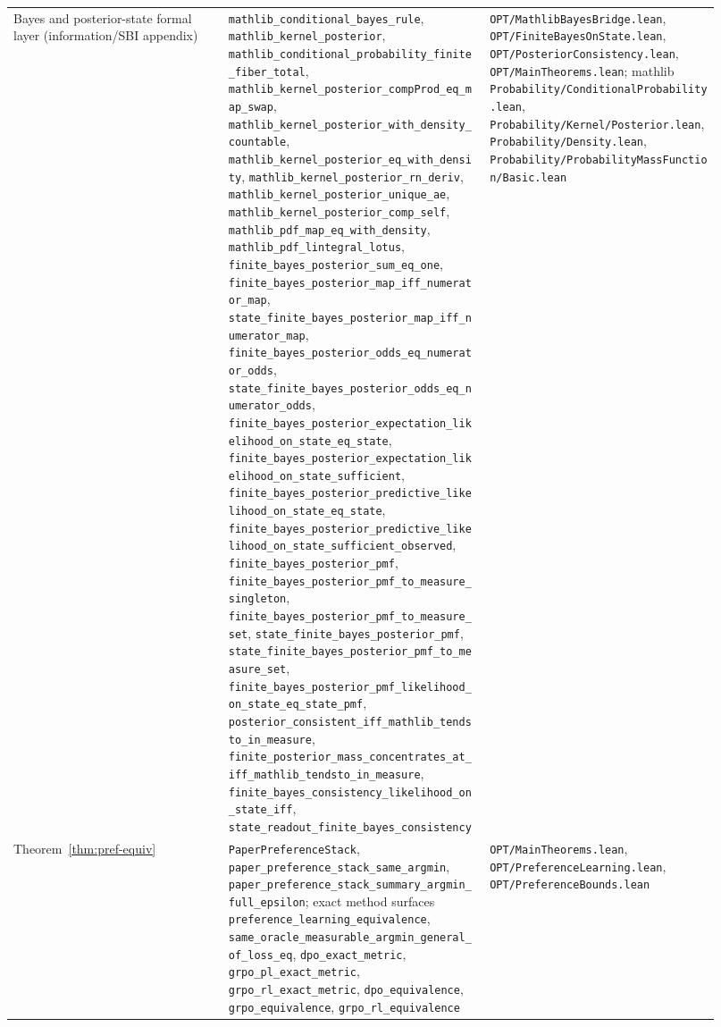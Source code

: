 \begin{table}[h]
\begin{tabular}{p{0.28\linewidth}p{0.34\linewidth}p{0.30\linewidth}}
Bayes and posterior-state formal layer (information/SBI appendix) &
\texttt{mathlib\_conditional\_bayes\_rule}, \texttt{mathlib\_kernel\_posterior},
\nolinkurl{mathlib_conditional_probability_finite_fiber_total},
\nolinkurl{mathlib_kernel_posterior_compProd_eq_map_swap},
\nolinkurl{mathlib_kernel_posterior_with_density_countable},
\nolinkurl{mathlib_kernel_posterior_eq_with_density},
\nolinkurl{mathlib_kernel_posterior_rn_deriv},
\nolinkurl{mathlib_kernel_posterior_unique_ae},
\nolinkurl{mathlib_kernel_posterior_comp_self},
\texttt{mathlib\_pdf\_map\_eq\_with\_density},
\texttt{mathlib\_pdf\_lintegral\_lotus},
\texttt{finite\_bayes\_posterior\_sum\_eq\_one},
\nolinkurl{finite_bayes_posterior_map_iff_numerator_map},
\nolinkurl{state_finite_bayes_posterior_map_iff_numerator_map},
\nolinkurl{finite_bayes_posterior_odds_eq_numerator_odds},
\nolinkurl{state_finite_bayes_posterior_odds_eq_numerator_odds},
\nolinkurl{finite_bayes_posterior_expectation_likelihood_on_state_eq_state},
\nolinkurl{finite_bayes_posterior_expectation_likelihood_on_state_sufficient},
\nolinkurl{finite_bayes_posterior_predictive_likelihood_on_state_eq_state},
\nolinkurl{finite_bayes_posterior_predictive_likelihood_on_state_sufficient_observed},
\texttt{finite\_bayes\_posterior\_pmf},
\nolinkurl{finite_bayes_posterior_pmf_to_measure_singleton},
\nolinkurl{finite_bayes_posterior_pmf_to_measure_set},
\texttt{state\_finite\_bayes\_posterior\_pmf},
\nolinkurl{state_finite_bayes_posterior_pmf_to_measure_set},
\nolinkurl{finite_bayes_posterior_pmf_likelihood_on_state_eq_state_pmf},
\nolinkurl{posterior_consistent_iff_mathlib_tendsto_in_measure},
\nolinkurl{finite_posterior_mass_concentrates_at_iff_mathlib_tendsto_in_measure},
\nolinkurl{finite_bayes_consistency_likelihood_on_state_iff},
\texttt{state\_readout\_finite\_bayes\_consistency} &
\texttt{OPT/MathlibBayesBridge.lean}, \texttt{OPT/FiniteBayesOnState.lean},
\texttt{OPT/PosteriorConsistency.lean}, \texttt{OPT/MainTheorems.lean};
mathlib \texttt{Probability/ConditionalProbability.lean},
\texttt{Probability/Kernel/Posterior.lean},
\texttt{Probability/Density.lean},
\texttt{Probability/ProbabilityMassFunction/Basic.lean} \\

Theorem~\ref{thm:pref-equiv} &
\texttt{PaperPreferenceStack}, \texttt{paper\_preference\_stack\_same\_argmin}, \texttt{paper\_preference\_stack\_summary\_argmin\_full\_epsilon}; exact method surfaces \texttt{preference\_learning\_equivalence}, \texttt{same\_oracle\_measurable\_argmin\_general\_of\_loss\_eq}, \texttt{dpo\_exact\_metric}, \texttt{grpo\_pl\_exact\_metric}, \texttt{grpo\_rl\_exact\_metric}, \texttt{dpo\_equivalence}, \texttt{grpo\_equivalence}, \texttt{grpo\_rl\_equivalence} &
\texttt{OPT/MainTheorems.lean}, \texttt{OPT/PreferenceLearning.lean}, \texttt{OPT/PreferenceBounds.lean} \\


\end{tabular}
\end{table}
